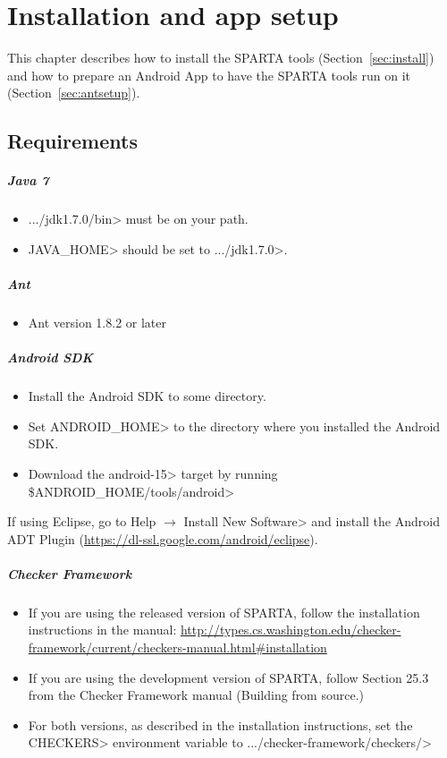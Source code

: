 \htmlhr
\chapter{Installation and app setup\label{installation}}
This chapter describes how to install the SPARTA tools
(Section~\ref{sec:install}) and how to prepare an Android App to have the
SPARTA tools run on it (Section~\ref{sec:antsetup}).

\section {Requirements\label{sec:requirements}}
\paragraph{Java 7}
\begin{itemize}
 \item  \<.../jdk1.7.0/bin> must be on your path.
 \item \<JAVA\_HOME> should be set to \<.../jdk1.7.0>.
\end{itemize}

\paragraph{Ant}
\begin{itemize}
 \item Ant version 1.8.2 or later
\end{itemize}

\paragraph{Android SDK}
\begin{itemize}
 \item Install the Android SDK to some directory. 
 \item Set \<ANDROID\_HOME> to the directory where you installed the
   Android SDK.
 \item Download the \<android-15> target by running \<\$ANDROID\_HOME/tools/android>
\end{itemize}

If using Eclipse, go to
\<Help $\rightarrow$ Install New Software>
and install the Android ADT Plugin (\url{https://dl-ssl.google.com/android/eclipse}).

\paragraph{Checker Framework}
\begin{itemize}
\item If you are using the released version of SPARTA, follow the installation instructions in the manual: 
\url{http://types.cs.washington.edu/checker-framework/current/checkers-manual.html#installation}
\item If you are using the development version of SPARTA,  follow Section 25.3 from the Checker Framework manual (Building from source.)
\item  For both versions, as described in the installation instructions, set the \<CHECKERS>
  environment variable to \<.../checker-framework/checkers/>
\end{itemize}


